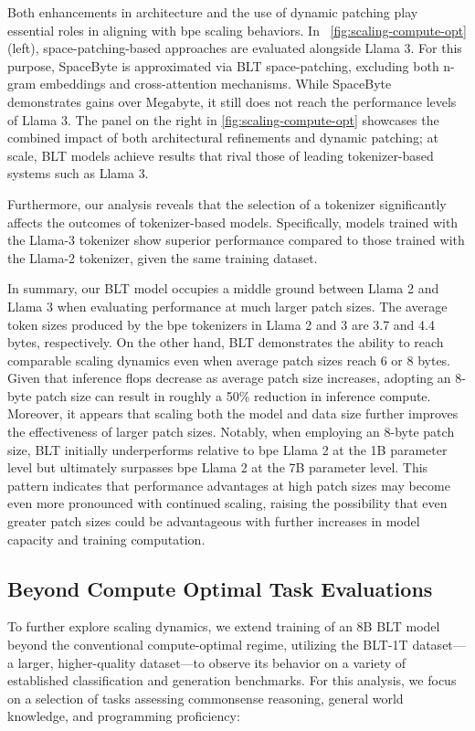 Both enhancements in architecture and the use of dynamic patching play essential roles in aligning with bpe scaling behaviors. In ~\autoref{fig:scaling-compute-opt} (left), space-patching-based approaches are evaluated alongside Llama 3. For this purpose, SpaceByte \citep{slagle2024spacebyte} is approximated via {\textsc BLT} space-patching, excluding both n-gram embeddings and cross-attention mechanisms. While SpaceByte demonstrates gains over Megabyte, it still does not reach the performance levels of Llama 3. The panel on the right in \autoref{fig:scaling-compute-opt} showcases the combined impact of both architectural refinements and dynamic patching; at scale, {\textsc BLT} models achieve results that rival those of leading tokenizer-based systems such as Llama 3.

Furthermore, our analysis reveals that the selection of a tokenizer significantly affects the outcomes of tokenizer-based models. Specifically, models trained with the Llama-3 tokenizer show superior performance compared to those trained with the Llama-2 tokenizer, given the same training dataset.

In summary, our {\textsc BLT} model occupies a middle ground between Llama 2 and Llama 3 when evaluating performance at much larger patch sizes. The average token sizes produced by the bpe tokenizers in Llama 2 and 3 are 3.7 and 4.4 bytes, respectively. On the other hand, {\textsc BLT} demonstrates the ability to reach comparable scaling dynamics even when average patch sizes reach 6 or 8 bytes. Given that inference flops decrease as average patch size increases, adopting an 8-byte patch size can result in roughly a 50\% reduction in inference compute. Moreover, it appears that scaling both the model and data size further improves the effectiveness of larger patch sizes. Notably, when employing an 8-byte patch size, {\textsc BLT} initially underperforms relative to bpe Llama 2 at the 1B parameter level but ultimately surpasses bpe Llama 2 at the 7B parameter level. This pattern indicates that performance advantages at high patch sizes may become even more pronounced with continued scaling, raising the possibility that even greater patch sizes could be advantageous with further increases in model capacity and training computation.

\subsection{Beyond Compute Optimal Task Evaluations}
\label{section:evals}
To further explore scaling dynamics, we extend training of an 8B {\textsc BLT} model beyond the conventional compute-optimal regime, utilizing the {\textsc BLT}-1T dataset—a larger, higher-quality dataset—to observe its behavior on a variety of established classification and generation benchmarks. For this analysis, we focus on a selection of tasks assessing commonsense reasoning, general world knowledge, and programming proficiency:
